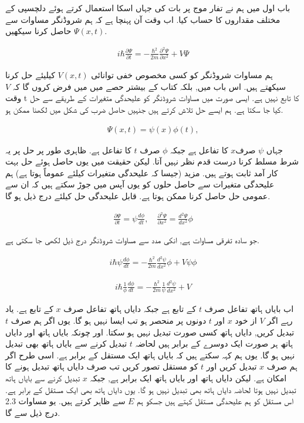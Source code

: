 

باب اول میں ہم نے تفار موج پر بات کی جہاں اسکا استعمال کرتے ہوئے دلچسپی کے مختلف مقداروں کا حساب کیا. اب وقت آن پہنچا ہے کہ ہم شروڈنگر مساوات سے \( \Psi (x,t) \)   حاصل کرنا سیکھیں. 

\begin{align}
i \hbar \frac{\partial \Psi}{\partial t} = - \frac{\hbar^{2}}{2 m} \frac{\partial^{2} \Psi}{\partial x^{2}} + V\Psi
\end{align}
  

ہم مساوات شروڈنگر کو کسی مخصوص خفی توانائی \( V (x,t) \) کیلیئے حل کرنا سیکھتے ہیں. اس باب میں, بلکہ کتاب کے بیشتر حصے میں میں فرض کروں گا کہ  \( V \) وقت t کا تابع نہیں ہے. ایسی صورت میں مساوات شروڈنگر کو علیحدگی متغیرات کے طریقے سے حل کیا جا سکتا ہے. ہم ایسے حل تلاش کرتے ہیں جنہیں حاصل ضرب کی شکل میں لکھنا ممکن ہو. 

\begin{align}
\Psi (x,t) = \psi (x)  \phi (t),
\end{align}

جہاں \( \psi \) صرف\( x \) 
 کا تفاعل ہے جبکہ \( \phi \)
  صرف  \( t \)  کا تفاعل ہے. ظاہری طور پر حل پر یہ شرط مسلط کرنا درست قدم نظر نہیں آتا. لیکن حقیقت میں یوں حاصل ہوئے حل بہت کار آمد ثابت ہوتے ہیں. مزید (جیسا کہ علیحدگی متغیرات کیلئے عموماً ہوتا ہے)  ہم علیحدگی متغیرات سے حاصل حلوں کو یوں آپس میں جوڑ سکتے ہیں کہ ان سے عمومی حل حاصل کرنا ممکن ہوتا ہے. قابل علیحدگی حل کیلئے درج ذیل ہو گا. 

\begin{align*}
\frac{\partial \Psi }{\partial t} = \psi \frac{d \phi}{d t}, \quad \frac{\partial^{2} \Psi}{\partial x^{2}} = \frac{d^{2} \Psi}{d x^{2}} \phi
\end{align*}

جو سادہ تفرقی مساوات ہے,  انکی مدد سے مساوات شروڈنگر درج ذیل لکھی جا سکتی ہے. 

\begin{align*}
i \hbar \psi \frac{d \phi}{d t} = - \frac{\hbar^{2}}{2m} \frac{d^{2} \psi}{d x^{2}} \phi + V\psi\phi
\end{align*}

\begin{align}
i\hbar\frac{1}{\phi} \frac{d \phi}{d t} = - \frac{\hbar^{2}}{2m} \frac{1}{\psi} \frac{d^{2} \psi}{d x^{2}} + V
\end{align}

اب بایاں ہاتھ تفاعل صرف \( t \) کے تابع ہے جبکہ دایاں ہاتھ تفاعل صرف \( x \) کے تابع ہے. یاد رہے اگر \( V \) از خود \( x \) اور \( t \) دونوں پر منحصر ہو تب ایسا نہیں ہو گا. یوں اگر ہم صرف \( t \) تبدیل کریں, دایاں ہاتھ کسی صورت تبدیل نہیں ہو سکتا. اور چونکہ بایاں ہاتھ اور دایاں ہاتھ ہر صورت ایک دوسرے کے برابر ہیں لحاضہ \( t \) تبدیل کرنے سے بایاں ہاتھ بھی تبدیل نہیں ہو گا. یوں ہم کہہ سکتے ہیں کہ بایاں ہاتھ ایک مستقل کے برابر ہے. اسی طرح اگر ہم صرف \( x \) تبدیل کریں اور \( t \) کو مستقل تصور کریں تب صرف دایاں ہاتھ تبدیل ہونے کا امکان ہے. لیکن دایاں ہاتھ اور بایاں ہاتھ ایک برابر ہے,  جبکہ \( x \) تبدیل کرنے سے بایاں ہاتھ تبدیل نہیں ہوتا لحاضہ دایاں ہاتھ بھی تبدیل نہیں ہو گا. یوں دایاں ہاتھ بھی ایک مستقل کے برابر ہے. اس مستقل کو ہم علیحدگی مستقل کہتے ہیں جسکو ہم \( E \) سے ظاہر کرتے ہیں. یو مساوات 2.3 درج ذیل سے گا. 

